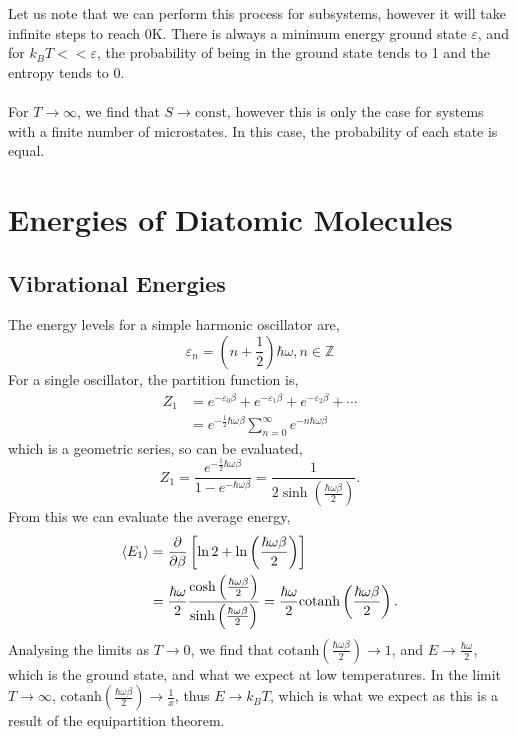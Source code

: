 \documentclass{book}
\begin{document}
Let us note that we can perform this process for subsystems, however it will take infinite steps to reach 0K. There is always a minimum energy ground state $\varepsilon$, and for $k_BT << \varepsilon$, the probability of being in the ground state tends to 1 and the entropy tends to 0. 
\\\\
For $T \to \infty$, we find that $S \to \text{const}$, however this is only the case for systems with a finite number of microstates. In this case, the probability of each state is equal.
\section{Energies of Diatomic Molecules}
\subsection{Vibrational Energies}
The energy levels for a simple harmonic oscillator are,
\begin{equation}
	\varepsilon_n = \left(n + \frac{1}{2}\right)\hbar \omega, n \in \mathbb{Z}
\end{equation}
For a single oscillator, the partition function is,
\begin{equation}
	\begin{split}
		Z_1 & = e^{-\varepsilon_0\beta} + e^{-\varepsilon_1\beta} + e^{-\varepsilon_2 \beta} + \cdots  \\
		&  = e^{-\frac{1}{2}\hbar\omega\beta}\sum_{n=0}^{\infty}e^{-n\hbar\omega\beta}
	\end{split}
\end{equation}
which is a geometric series, so can be evaluated,
\begin{equation}
	Z_1 = \frac{e^{-\frac{1}{2}\hbar\omega\beta}}{1-e^{-\hbar\omega\beta}} = \frac{1}{2\sinh(\frac{\hbar\omega\beta}{2})}.
\end{equation}
From this we can evaluate the average energy,
\begin{equation}
	\begin{split}
	\left<E_1\right> &= \pdv{\beta}\left[\ln2 +\ln\left(\frac{\hbar\omega\beta}{2}\right) \right]\\
	& = \frac{\hbar\omega}{2}\frac{\cosh\left(\frac{\hbar\omega\beta}{2}\right)}{\sinh\left(\frac{\hbar\omega\beta}{2}\right)} = \frac{\hbar\omega}{2}\text{cotanh}\left(\frac{\hbar\omega\beta}{2}\right).
	\end{split}
\end{equation}
Analysing the limits as $T \to 0$, we find that $\text{cotanh}\left(\frac{\hbar\omega\beta}{2}\right) \to 1$, and $E \to \frac{\hbar \omega}{2}$, which is the ground state, and what we expect at low temperatures. In the limit $T \to \infty$, $\text{cotanh}\left(\frac{\hbar\omega\beta}{2}\right) \to \frac{1}{x}$, thus $E \to k_BT$, which is what we expect as this is a result of the equipartition theorem.
\end{document}
